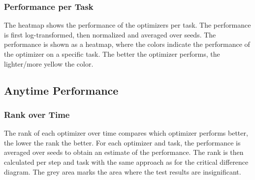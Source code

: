 \documentclass{article}
\begin{document}
\subsubsection{Performance per Task}
The heatmap shows the performance of the optimizers per task. The performance is first log-transformed, then normalized and averaged over seeds. The performance is shown as a heatmap, where the colors indicate the performance of the optimizer on a specific task. The better the optimizer performs, the lighter/more yellow the color.

\subsection{Anytime Performance}
\subsubsection{Rank over Time}
The rank of each optimizer over time compares which optimizer performs better, the lower the rank the better. For each optimizer and task, the performance is averaged over seeds to obtain an estimate of the performance. The rank is then calculated per step and task with the same approach as for the critical difference diagram. The grey area marks the area where the test results are insignificant.
\end{document}
